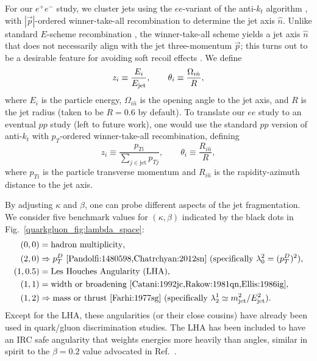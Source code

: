 \documentclass[11pt]{cernrep}
\begin{document}
For our $e^+ e^-$ study, we cluster jets using the $ee$-variant of the
anti-$k_t$ algorithm \cite{Cacciari:2008gp}, with $|\vec{p}|$-ordered
winner-take-all recombination
\cite{Larkoski:2014uqa,Bertolini:2013iqa,Salam:WTAUnpublished} to
determine the jet axis $\hat{n}$.  Unlike standard $E$-scheme
recombination \cite{Blazey:2000qt}, the winner-take-all scheme yields
a jet axis $\hat{n}$ that does not necessarily align with the jet
three-momentum $\vec{p}$; this turns out to be a desirable feature
for avoiding soft recoil effects
\cite{Larkoski:2013eya,Larkoski:2014uqa,Catani:1992jc,Dokshitzer:1998kz,Banfi:2004yd}.
We define
\begin{equation}
z_i \equiv \frac{E_i}{E_{\rm jet}}, \qquad \theta_i \equiv \frac{\Omega_{i \hat{n}}}{R},
\end{equation}
where $E_i$ is the particle energy, $\Omega_{i \hat{n}}$ is the opening angle to the jet axis, and $R$ is the jet radius (taken to be $R = 0.6$ by default).  To translate our $ee$ study to an eventual $pp$ study (left to future work), one would use the standard $pp$ version of anti-$k_t$ with $p_T$-ordered winner-take-all recombination, defining
\begin{equation}
z_i \equiv \frac{p_{Ti}}{\sum_{j \in \text{jet}} p_{Tj}}, \qquad \theta_i \equiv \frac{R_{i \hat{n}}}{R},
\end{equation}
where $p_{Ti}$ is the particle transverse momentum and $R_{i \hat{n}}$ is the rapidity-azimuth distance to the jet axis.



By adjusting $\kappa$ and $\beta$, one can probe different aspects of the jet fragmentation.  We consider five benchmark values for $(\kappa, \beta)$ indicated by the black dots in Fig.~\ref{quarkgluon_fig:lambda_space}:
\begin{equation}
\label{quarkgluon_eq:benchmarkang}
\begin{aligned}
(0,0) &= \text{hadron multiplicity},\\
(2,0) &\Rightarrow p_T^D \text{  \cite{Pandolfi:1480598,Chatrchyan:2012sn} (specifically $\lambda^{2}_{0} = (p_T^D)^2$)},\\
(1,0.5) & = \text{Les Houches Angularity (LHA)},\\
(1,1) &= \text{width or broadening \cite{Catani:1992jc,Rakow:1981qn,Ellis:1986ig}},\\
(1,2) & \Rightarrow \text{mass or thrust \cite{Farhi:1977sg}
  (specifically $\lambda^{1}_{2} \simeq m_{\rm jet}^2 / E_{\rm
    jet}^2$)}.
\end{aligned}
\end{equation}
Except for the LHA, these angularities (or their close cousins) have already been used in quark/gluon discrimination studies.  The LHA has been included to have an IRC safe angularity that weights energies more heavily than angles, similar in spirit to the $\beta = 0.2$ value advocated in Ref.~\cite{Larkoski:2013eya}.
\end{document}
